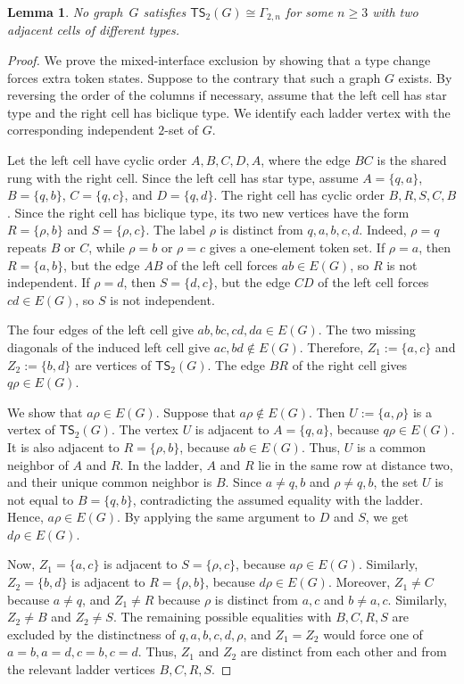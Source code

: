 \documentclass[a4paper]{article}
\theoremstyle{plain}
\newtheorem{lemma}[lemma]{Lemma}
\theoremstyle{definition}
\newcommand{\TSsym}{\mathsf{TS}}
\numberwithin{equation}{section}
\begin{document}
\begin{lemma}
\label{lem:ladder-mixed-interface}
No graph~$G$ satisfies $\TSsym_2(G)\cong \Gamma_{2,n}$ for some $n\ge 3$ with two adjacent cells of different types.
\end{lemma}

\begin{proof}
We prove the mixed-interface exclusion by showing that a type change forces extra token states.
Suppose to the contrary that such a graph $G$ exists.
By reversing the order of the columns if necessary, assume that the left cell has star type and the right cell has biclique type.
We identify each ladder vertex with the corresponding independent $2$-set of $G$.

Let the left cell have cyclic order $A,B,C,D,A$, where the edge $BC$ is the shared rung with the right cell.
Since the left cell has star type, assume
$A=\{q,a\}$, $B=\{q,b\}$, $C=\{q,c\}$, and $D=\{q,d\}$.
The right cell has cyclic order $B,R,S,C,B$.
Since the right cell has biclique type, its two new vertices have the form $R=\{\rho,b\}$ and $S=\{\rho,c\}$.
The label $\rho$ is distinct from $q,a,b,c,d$.
Indeed, $\rho=q$ repeats $B$ or $C$, while $\rho=b$ or $\rho=c$ gives a one-element token set.
If $\rho=a$, then $R=\{a,b\}$, but the edge $AB$ of the left cell forces $ab\in E(G)$, so $R$ is not independent.
If $\rho=d$, then $S=\{d,c\}$, but the edge $CD$ of the left cell forces $cd\in E(G)$, so $S$ is not independent.

The four edges of the left cell give $ab,bc,cd,da\in E(G)$.
The two missing diagonals of the induced left cell give
$ac,bd\notin E(G)$.
Therefore, $Z_1:=\{a,c\}$ and $Z_2:=\{b,d\}$ are vertices of $\TSsym_2(G)$.
The edge $BR$ of the right cell gives $q\rho\in E(G)$.

We show that $a\rho\in E(G)$.
Suppose that $a\rho\notin E(G)$.
Then $U:=\{a,\rho\}$ is a vertex of $\TSsym_2(G)$.
The vertex $U$ is adjacent to $A=\{q,a\}$, because $q\rho\in E(G)$.
It is also adjacent to $R=\{\rho,b\}$, because $ab\in E(G)$.
Thus, $U$ is a common neighbor of $A$ and $R$.
In the ladder, $A$ and $R$ lie in the same row at distance two, and their unique common neighbor is $B$.
Since $a\ne q,b$ and $\rho\ne q,b$, the set $U$ is not equal to $B=\{q,b\}$, contradicting the assumed equality with the ladder.
Hence, $a\rho\in E(G)$.
By applying the same argument to $D$ and $S$, we get $d\rho\in E(G)$.

Now, $Z_1=\{a,c\}$ is adjacent to $S=\{\rho,c\}$, because $a\rho\in E(G)$.
Similarly, $Z_2=\{b,d\}$ is adjacent to $R=\{\rho,b\}$, because $d\rho\in E(G)$.
Moreover, $Z_1\ne C$ because $a\ne q$, and $Z_1\ne R$ because $\rho$ is distinct from $a,c$ and $b\ne a,c$.
Similarly, $Z_2\ne B$ and $Z_2\ne S$.
The remaining possible equalities with $B,C,R,S$ are excluded by the distinctness of $q,a,b,c,d,\rho$, and $Z_1=Z_2$ would force one of $a=b,a=d,c=b,c=d$.
Thus, $Z_1$ and $Z_2$ are distinct from each other and from the relevant ladder vertices $B,C,R,S$.


\end{proof}
\end{document}
